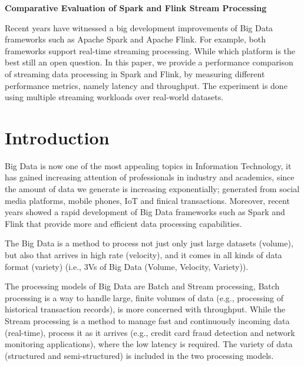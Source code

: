 \documentclass[]{article}
\begin{document}
\begin{flushleft}
\centering\LARGE {\bf Comparative Evaluation of Spark and Flink Stream Processing}
\thispagestyle{empty}
\end{flushleft}
\newpage
\tableofcontents

\newpage


\begin{abstract}

\end{abstract}
Recent years have witnessed a big development improvements of Big Data frameworks such as Apache Spark and Apache Flink. For example, both frameworks support real-time
streaming processing. While which platform is the best still an open question. 
In this paper, we provide a performance comparison of streaming data processing in Spark and Flink, by measuring different performance metrics, namely latency and throughput. The experiment is done using multiple streaming workloads over real-world datasets.
\section{Introduction}

\par Big Data is now one of the most appealing topics in Information Technology, it has gained increasing attention of professionals in industry and academics, since the amount of data we generate is increasing exponentially; generated from social media platforms, mobile phones, IoT and finical transactions. Moreover, recent years showed a rapid development of Big Data frameworks such as Spark and Flink that provide more and efficient data processing capabilities.
 \par The Big Data is a method to process not just only just large datasets (volume), but also that arrives in high rate (velocity), and it comes in all kinds of data format (variety) (i.e., 3Vs of Big Data (Volume, Velocity, Variety))\cite{svs}.

\par The processing models of Big Data are Batch and Stream processing, Batch processing is a way to handle large, finite volumes of data (e.g., processing of historical transaction records), is more concerned with throughput. While the Stream processing  is a method to manage fast and continuously incoming data (real-time), process it as it arrives (e.g., credit card fraud detection and network monitoring applications), where the low latency is required. The variety of data (structured and semi-structured) is included in the two processing models.
\end{document}
